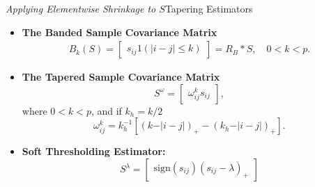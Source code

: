 \begin{frame}{\textit{Applying Elementwise Shrinkage to $S$}}{Tapering Estimators}\label{shrinkage-estimators}
	\footnotesize
	\begin{itemize}
 	\item \textbf{The Banded Sample Covariance Matrix} 
	\begin{align*}%
		B_k\left(S\right) = \begin{bmatrix} s_{ij} 1\left(\vert i-j \vert \le k\right) \end{bmatrix} = R_B \ast S,\quad 0 < k < p.
		\end{align*}
	\item \textbf{The Tapered Sample Covariance Matrix} 
		 	\begin{equation*}%
			S^{\omega} =  \begin{bmatrix} \omega_{ij}^k s_{ij} \end{bmatrix},
			\end{equation*}
		where $0 < k < p$, and if $k_h = k/2$ 
		\begin{equation*}
		\omega^k_{ij} = k_h^{-1} \left[ \left( k - \vert i-j\vert\right)_+ - \left(k_h - \vert i-j\vert\right)_+ \right].
		\end{equation*}
	\item \textbf{Soft Thresholding Estimator:} 
			\begin{equation*}%
			S^{\lambda} =   \begin{bmatrix} \mbox{sign}\left(s_{ij}\right) \left(s_{ij} - \lambda\right)_+ \end{bmatrix}
			\end{equation*}	\footnotesize
	\end{itemize}
\hyperlink{simulation-studies-benchmark-estimators}{}
\end{frame}
